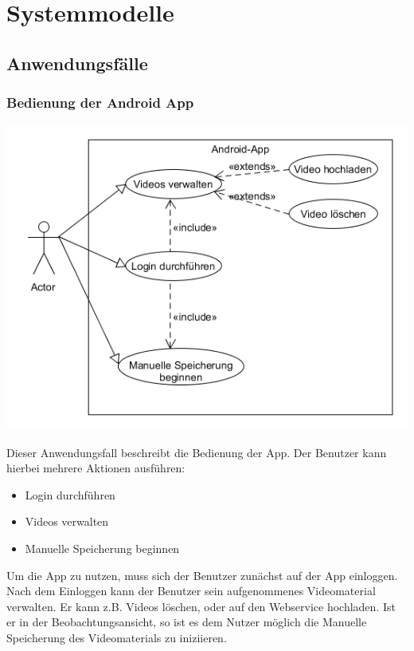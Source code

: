 \chapter{Systemmodelle}
\section{Anwendungsfälle}
\subsection{Bedienung der Android App}
\begin{center}
\includegraphics[width=1\textwidth]{subtopicsFuncspec/Res/systemModels/App-AFD-UML.png}
\end{center}
Dieser Anwendungsfall beschreibt die Bedienung der App. 
Der Benutzer kann hierbei mehrere Aktionen ausführen:
\begin{itemize}
\itemsep0pt
\item Login durchführen
\item Videos verwalten
\item Manuelle Speicherung beginnen
\end{itemize}
Um die App zu nutzen, muss sich der Benutzer zunächst auf der App einloggen. Nach dem Einloggen kann der Benutzer sein aufgenommenes Videomaterial verwalten. Er kann z.B. Videos löschen, oder auf den Webservice hochladen.
Ist er in der Beobachtungsansicht, so ist es dem Nutzer möglich die Manuelle Speicherung des Videomaterials zu iniziieren.

